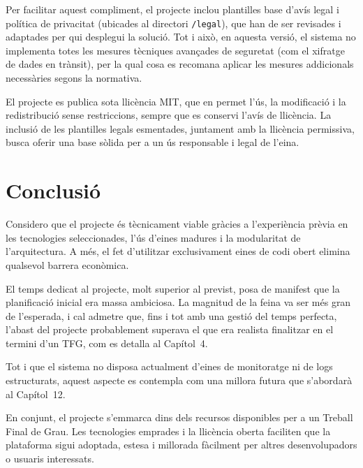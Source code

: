 Per facilitar aquest compliment, el projecte inclou plantilles base d'avís legal i política de privacitat (ubicades al directori \texttt{/legal}), que han de ser revisades i adaptades per qui desplegui la solució. Tot i això, en aquesta versió, el sistema no implementa totes les mesures tècniques avançades de seguretat (com el xifratge de dades en trànsit), per la qual cosa es recomana aplicar les mesures addicionals necessàries segons la normativa.

El projecte es publica sota llicència MIT, que en permet l'ús, la modificació i la redistribució sense restriccions, sempre que es conservi l'avís de llicència. La inclusió de les plantilles legals esmentades, juntament amb la llicència permissiva, busca oferir una base sòlida per a un ús responsable i legal de l'eina.

\section{Conclusi\'o}

Considero que el projecte és tècnicament viable gràcies a l'experiència prèvia en les tecnologies seleccionades, l'ús d'eines madures i la modularitat de l'arquitectura. A més, el fet d'utilitzar exclusivament eines de codi obert elimina qualsevol barrera econòmica.

El temps dedicat al projecte, molt superior al previst, posa de manifest que la planificació inicial era massa ambiciosa. La magnitud de la feina va ser més gran de l'esperada, i cal admetre que, fins i tot amb una gestió del temps perfecta, l'abast del projecte probablement superava el que era realista finalitzar en el termini d'un TFG, com es detalla al Capítol~4.

Tot i que el sistema no disposa actualment d'eines de monitoratge ni de logs estructurats, aquest aspecte es contempla com una millora futura que s'abordarà al Capítol~12.

En conjunt, el projecte s'emmarca dins dels recursos disponibles per a un Treball Final de Grau. Les tecnologies emprades i la llicència oberta faciliten que la plataforma sigui adoptada, estesa i millorada fàcilment per altres desenvolupadors o usuaris interessats.

